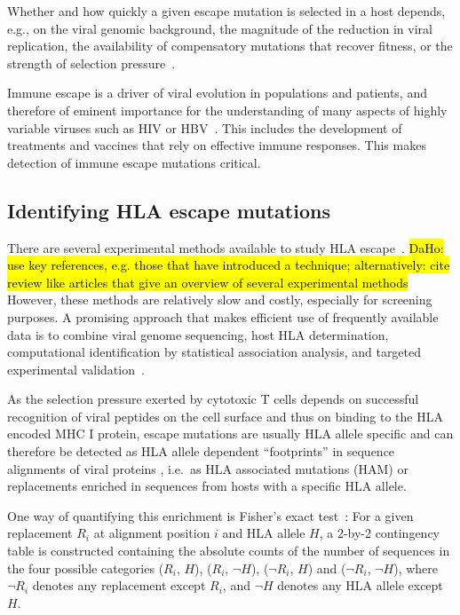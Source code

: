 \documentclass{bioinfo}
\begin{document}
Whether and how quickly a given escape mutation is selected in a host depends, e.g., on the viral genomic background, the magnitude of the reduction in viral replication, the availability of compensatory mutations that recover fitness, or the strength of selection pressure~\citep{Kloverpris2016}.

Immune escape is a driver of viral evolution in populations and patients, and therefore of eminent importance for the understanding of many aspects of highly variable viruses such as HIV or HBV~\citep{Alizon2011, Allen2005, Rousseau2008, Lumley2018}. This includes the development of treatments and vaccines that rely on effective immune responses. This makes detection of immune escape mutations critical.

\subsection{Identifying HLA escape mutations}

There are several experimental methods available to study HLA escape~\citep{Timm2004}.  \hl{DaHo: use key references, e.g. those that have introduced a technique; alternatively: cite review like articles that give an overview of several experimental methods} However, these methods are relatively slow and costly, especially for screening purposes. A promising approach that makes efficient use of frequently available data is to combine viral genome sequencing, host HLA determination, computational identification by statistical association analysis, and targeted experimental validation~\citep{Carlson2012}.

As the selection pressure exerted by cytotoxic T cells depends on successful recognition of viral peptides on the cell surface and thus on binding to the HLA encoded MHC I protein, escape mutations are usually HLA allele specific and can therefore be detected as HLA allele dependent ``footprints'' in sequence alignments of viral proteins  \citep{Moore2002}, i.e.\ as HLA associated mutations (HAM) or replacements enriched in sequences from hosts with a specific HLA allele.

One way of quantifying this enrichment is Fisher's exact test~\citep{Fisher1922}: For a given replacement \(R_{i}\) at alignment position \(i\) and HLA allele \(H\), a 2-by-2 contingency table is constructed containing the absolute counts of the number of sequences in the four possible categories  (\(R_{i}\), \(H\)), (\(R_{i}\), \(\neg H\)), (\(\neg R_{i}\), \(H\)) and (\(\neg R_{i}\), \(\neg H\)), where \(\neg R_{i}\) denotes any replacement except \(R_{i}\), and \(\neg H\) denotes any HLA allele except \(H\).
\end{document}
